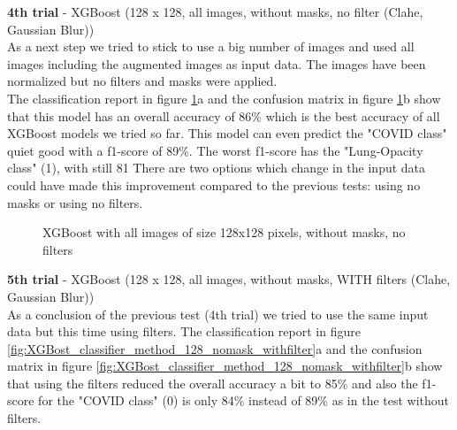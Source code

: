 \documentclass{article}
\begin{document}
\textbf{4th trial} - XGBoost (128 x 128, all images, without masks, no filter (Clahe, Gaussian Blur))\\
As a next step we tried to stick to use a big number of images and used all images including the augmented images as input data. The images have been normalized but
no filters and masks were applied. \\
The classification report in figure \ref{fig:XGBost_classifier_method_128_nomask_nofilter}a and the confusion matrix in figure 
\ref{fig:XGBost_classifier_method_128_nomask_nofilter}b show that this model has an overall accuracy of 86\% which is the best accuracy of all XGBoost models we 
tried so far. This model can even predict the "COVID class" quiet good with a f1-score of 89\%. The worst f1-score has the "Lung-Opacity class" (1), with still 81%
There are two options which change in the input data could have made this improvement compared to the previous tests: using no masks or using no filters. 

\begin{figure}[!ht]
  \centering
  \qquad
  \caption{XGBoost with all images of size 128x128 pixels, without masks, no filters}
  \label{fig:XGBost_classifier_method_128_nomask_nofilter}
\end{figure}



\textbf{5th trial} - XGBoost (128 x 128, all images, without masks, WITH filters (Clahe, Gaussian Blur))\\
As a conclusion of the previous test (4th trial) we tried to use the same input data but this time using filters. The classification report in 
figure \ref{fig:XGBost_classifier_method_128_nomask_withfilter}a and the confusion matrix in figure \ref{fig:XGBost_classifier_method_128_nomask_withfilter}b show
that using the filters reduced the overall accuracy a bit to 85\% and also the f1-score for the "COVID class" (0) is only 84\% instead of 89\% as in the 
test without filters. 
\end{document}
